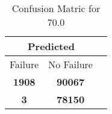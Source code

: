 \begin{table}[] 
\caption{Confusion Matric for 70.0} 
\label{Table: Prediction Accuracy-DMD70.0OnlySunEKF-ignoreReflection100.9EKF-top2-Reflection} 
\centering 
\begin{tabular} 
 {@{}ccc@{}} 
\toprule 
\multicolumn{2}{c}{\textbf{Predicted}}
 \\ \midrule 
\multicolumn{1}{|c|}{Failure} & 
\multicolumn{1}{c|}{No Failure}
 \\ \midrule 
\multicolumn{1}{|c|}{\color{green}\textbf{1908}} & 
\multicolumn{1}{c|}{\color{green}\textbf{90067}}
 \\ \midrule 
\multicolumn{1}{|c|}{\color{red}\textbf{3}} & 
\multicolumn{1}{c|}{\color{red}\textbf{78150}}
 \\ \bottomrule 
\end{tabular} 
\end{table} 
